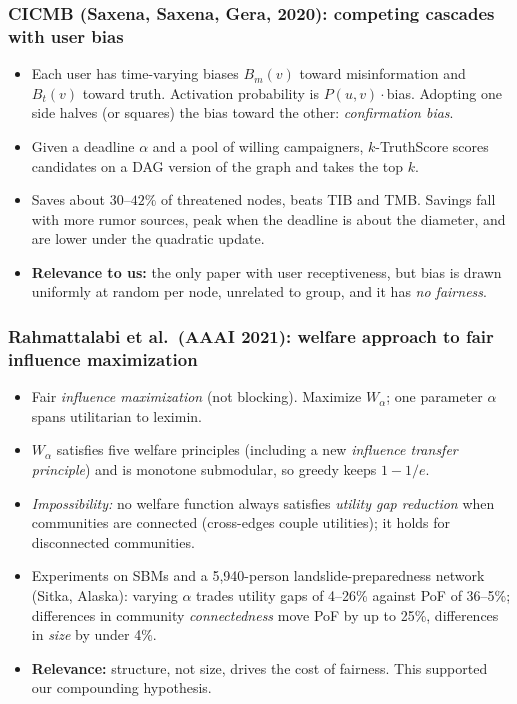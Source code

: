 \documentclass[11pt]{article}
\begin{document}
\subsubsection*{CICMB (Saxena, Saxena, Gera, 2020): competing cascades with user bias}
\begin{itemize}
\item Each user has time-varying biases $B_m(v)$ toward misinformation and $B_t(v)$ toward truth. Activation probability is $P(u,v)\cdot$bias. Adopting one side halves (or squares) the bias toward the other: \emph{confirmation bias}.
\item Given a deadline $\alpha$ and a pool of willing campaigners, $k$-TruthScore scores candidates on a DAG version of the graph and takes the top $k$.
\item Saves about $30$--$42\%$ of threatened nodes, beats TIB and TMB. Savings fall with more rumor sources, peak when the deadline is about the diameter, and are lower under the quadratic update.
\item \textbf{Relevance to us:} the only paper with user receptiveness, but bias is drawn uniformly at random per node, unrelated to group, and it has \emph{no fairness}.
\end{itemize}

\subsubsection*{Rahmattalabi et al.\ (AAAI 2021): welfare approach to fair influence maximization}
\begin{itemize}
\item Fair \emph{influence maximization} (not blocking). Maximize $W_\alpha$; one parameter $\alpha$ spans utilitarian to leximin.
\item $W_\alpha$ satisfies five welfare principles (including a new \emph{influence transfer principle}) and is monotone submodular, so greedy keeps $1-1/e$.
\item \emph{Impossibility:} no welfare function always satisfies \emph{utility gap reduction} when communities are connected (cross-edges couple utilities); it holds for disconnected communities.
\item Experiments on SBMs and a 5,940-person landslide-preparedness network (Sitka, Alaska): varying $\alpha$ trades utility gaps of 4--26\% against PoF of 36--5\%; differences in community \emph{connectedness} move PoF by up to 25\%, differences in \emph{size} by under 4\%.
\item \textbf{Relevance:} structure, not size, drives the cost of fairness. This supported our compounding hypothesis.
\end{itemize}
\end{document}

